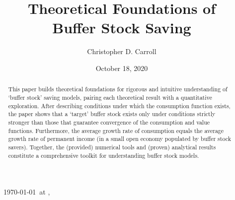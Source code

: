 \documentclass[BufferStockTheory]{subfiles}
\begin{document}
\providecommand{\versn}{} %
\ifthenelse{\boolean{ifWeb}}{  \renewcommand{\ushort}{\underline}\renewcommand{\versn}{Web} }{} %


\hfill{\tiny \jobname~\versn~\today~{at} \DTMcurrenttime, ~~}

\title{Theoretical Foundations of \\ Buffer Stock Saving}

\author{Christopher D. Carroll\authNum}



\renewcommand{\forcedate}{October 18, 2020}
\date{\forcedate}

\maketitle 
\hypertarget{abstract}{}
\begin{abstract}
  This paper builds theoretical foundations for rigorous and intuitive understanding of `buffer stock' saving models, pairing each theoretical result with a quantitative exploration.  After describing conditions under which the consumption function exists, the paper shows that a `target' buffer stock exists only under conditions strictly stronger than those that guarantee convergence of the consumption and value functions.  Furthermore, the average growth rate of consumption equals the average growth rate of permanent income (in a small open economy populated by buffer stock savers).  Together, the (provided) numerical tools and (proven) analytical results constitute a comprehensive toolkit for understanding buffer stock models.
\end{abstract}
\end{document}
